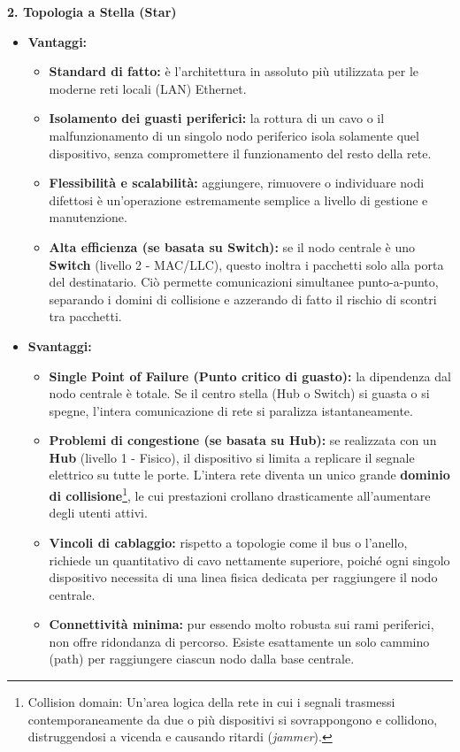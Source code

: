 \documentclass[a4paper,12pt]{report}
\begin{document}
\vspace{1cm}
\textbf{2. Topologia a Stella (Star)}
\begin{itemize}[leftmargin=*]
  \item \textbf{Vantaggi:}
  \begin{itemize}
    \item \textbf{Standard di fatto:} è l'architettura in assoluto più utilizzata per le moderne reti locali (LAN) Ethernet.
    \item \textbf{Isolamento dei guasti periferici:} la rottura di un cavo o il malfunzionamento di un singolo nodo periferico isola solamente quel dispositivo, senza compromettere il funzionamento del resto della rete.
    \item \textbf{Flessibilità e scalabilità:} aggiungere, rimuovere o individuare nodi difettosi è un'operazione estremamente semplice a livello di gestione e manutenzione.
    \item \textbf{Alta efficienza (se basata su Switch):} se il nodo centrale è uno \textbf{Switch} (livello 2 - MAC/LLC), questo inoltra i pacchetti solo alla porta del destinatario. Ciò permette comunicazioni simultanee punto-a-punto, separando i domini di collisione e azzerando di fatto il rischio di scontri tra pacchetti.
  \end{itemize}

  \newpage
  \item \textbf{Svantaggi:}
  \begin{itemize}
    \item \textbf{Single Point of Failure (Punto critico di guasto):} la dipendenza dal nodo centrale è totale. Se il centro stella (Hub o Switch) si guasta o si spegne, l'intera comunicazione di rete si paralizza istantaneamente.
    \item \textbf{Problemi di congestione (se basata su Hub):} se realizzata con un \textbf{Hub} (livello 1 - Fisico), il dispositivo si limita a replicare il segnale elettrico su tutte le porte. L'intera rete diventa un unico grande \textbf{dominio di collisione}\footnote{Collision domain: Un'area logica della rete in cui i segnali trasmessi contemporaneamente da due o più dispositivi si sovrappongono e collidono, distruggendosi a vicenda e causando ritardi (\textit{jammer}).}, le cui prestazioni crollano drasticamente all'aumentare degli utenti attivi.
    \item \textbf{Vincoli di cablaggio:} rispetto a topologie come il bus o l'anello, richiede un quantitativo di cavo nettamente superiore, poiché ogni singolo dispositivo necessita di una linea fisica dedicata per raggiungere il nodo centrale.
    \item \textbf{Connettività minima:} pur essendo molto robusta sui rami periferici, non offre ridondanza di percorso. Esiste esattamente un solo cammino (path) per raggiungere ciascun nodo dalla base centrale.
  \end{itemize}
\end{itemize}
\end{document}
